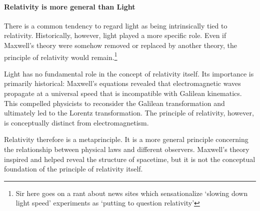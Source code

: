 	\paragraph{Relativity is more general than Light}







		There is a common tendency to regard light as being intrinsically tied to
		relativity. Historically, however, light played a more specific role. Even if
		Maxwell's theory were somehow removed or replaced by another theory, the principle of
		relativity would remain.\footnote{Sir here goes on a rant about news sites 
		which sensationalize `slowing down light speed' experiments as `putting to question
		relativity'}

		Light has no fundamental role in the concept of relativity itself. Its
		importance is primarily historical: Maxwell's equations revealed that
		electromagnetic waves propagate at a universal speed that is incompatible with
		Galilean kinematics. This compelled physicists to reconsider the Galilean
		transformation and ultimately led to the Lorentz transformation. The principle
		of relativity, however, is conceptually distinct from electromagnetism.

		Relativity therefore is a metaprinciple. It is a more general principle concerning the relationship between
		physical laws and different observers. Maxwell's theory inspired and helped reveal the
		structure of spacetime, but it is not the conceptual foundation of the
		principle of relativity itself.

